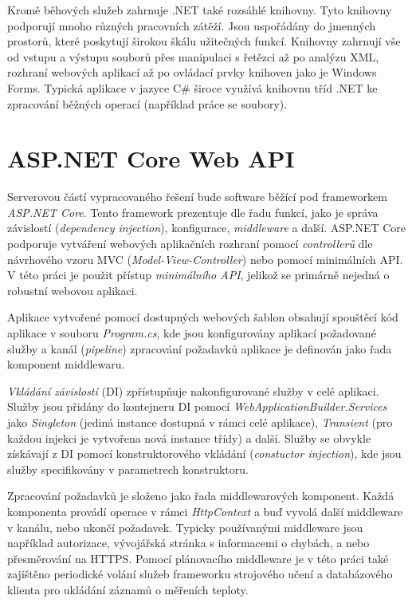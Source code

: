 Kromě běhových služeb zahrnuje .NET také rozsáhlé knihovny. Tyto knihovny podporují mnoho různých pracovních zátěží. Jsou uspořádány do jmenných prostorů, které poskytují širokou škálu užitečných funkcí. Knihovny zahrnují vše od vstupu a výstupu souborů přes manipulaci s řetězci až po analýzu XML, rozhraní webových aplikací až po ovládací prvky knihoven jako je Windows Forms. Typická aplikace v jazyce C\# široce využívá knihovnu tříd .NET ke zpracování běžných operací (například práce se soubory).


\section{ASP.NET Core Web API}
Serverovou částí vypracovaného řešení bude software běžící pod frameworkem {\it ASP.NET Core}. Tento framework prezentuje dle \cite{about_asp} řadu funkcí, jako je správa závislostí ({\it dependency injection}), konfigurace, {\it middleware} a další. ASP.NET Core podporuje vytváření webových aplikačních rozhraní pomocí {\it controllerů} \cite{asp_controllers} dle návrhového vzoru MVC ({\it Model-View-Controller}) nebo pomocí minimálních API. V této práci je použit přístup {\it minimálního API}, jelikož se primárně nejedná o robustní webovou aplikaci.

Aplikace vytvořené pomocí dostupných webových šablon obsahují spouštěcí kód aplikace v souboru {\it Program.cs}, kde jsou konfigurovány aplikací požadované služby a kanál ({\it pipeline}) zpracování požadavků aplikace je definován jako řada komponent middlewaru.

{\it Vkládání závislostí} (DI) zpřístupňuje nakonfigurované služby v celé aplikaci. Služby jsou přidány do kontejneru DI pomocí {\it WebApplicationBuilder.Services} jako {\it Singleton} (jediná instance dostupná v rámci celé aplikace), {\it Transient} (pro každou injekci je vytvořena nová instance třídy) a další. Služby se obvykle získávají z DI pomocí konstruktorového vkládání ({\it constuctor injection}), kde jsou služby specifikovány v parametrech konstruktoru.

Zpracování požadavků je složeno jako řada middlewarových komponent. Každá komponenta provádí operace v rámci {\it HttpContext} a buď vyvolá další middleware v kanálu, nebo ukončí požadavek. Typicky používanými middleware jsou například autorizace, vývojářská stránka s informacemi o chybách, a nebo přesměrování na HTTPS. Pomocí plánovacího middleware je v této práci také zajištěno periodické volání služeb frameworku strojového učení a databázového klienta pro ukládání záznamů o měřeních teploty.

